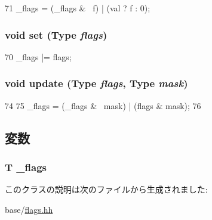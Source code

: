 \begin{DoxyCode}
71 { _flags = (_flags & ~f) | (val ? f : 0); }
\end{DoxyCode}
\hypertarget{classFlags_a8bf75cf89ee252c33f05dd2e8e06d351}{
\subsubsection[{set}]{\setlength{\rightskip}{0pt plus 5cm}void set ({\bf Type} {\em flags})}}
\label{classFlags_a8bf75cf89ee252c33f05dd2e8e06d351}



\begin{DoxyCode}
70 { _flags |= flags; }
\end{DoxyCode}
\hypertarget{classFlags_a6d2c1e5d026979d5dc449f445ec0dc98}{
\subsubsection[{update}]{\setlength{\rightskip}{0pt plus 5cm}void update ({\bf Type} {\em flags}, \/  {\bf Type} {\em mask})}}
\label{classFlags_a6d2c1e5d026979d5dc449f445ec0dc98}



\begin{DoxyCode}
74     {
75         _flags = (_flags & ~mask) | (flags & mask);
76     }
\end{DoxyCode}


\subsection{変数}
\hypertarget{classFlags_a1d4945ed95e4ef8f9668e313afb5bd12}{
\subsubsection[{\_\-flags}]{\setlength{\rightskip}{0pt plus 5cm}T {\bf \_\-flags}}}
\label{classFlags_a1d4945ed95e4ef8f9668e313afb5bd12}


このクラスの説明は次のファイルから生成されました:\begin{DoxyCompactItemize}
\item 
base/\hyperlink{flags_8hh}{flags.hh}\end{DoxyCompactItemize}
